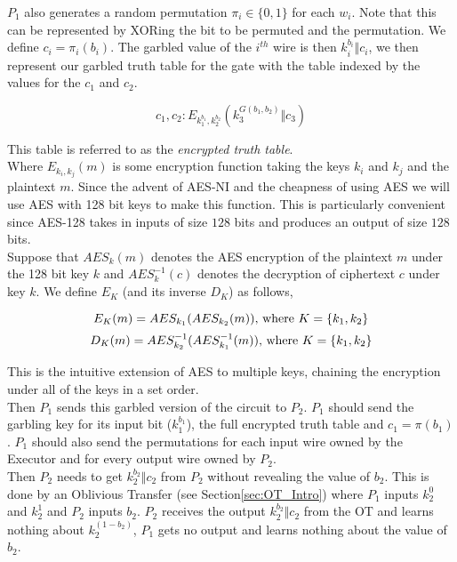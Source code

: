 \documentclass[ %
                    author={Nicholas Tutte},
                supervisor={Prof. Nigel Smart},
                    degree={MEng},
                     title={Secure Two Party Computation},
                  subtitle={A practical comparison of recent protocols},
                      type={Research - GG1K},
                      year={2015} ]{dissertation}
\begin{document}
			$P_1$ also generates a random permutation $\pi_i \in \{0, 1\}$ for each $w_i$. Note that this can be represented by XORing the bit to be permuted and the permutation. We define $c_i = \pi_i(b_i)$. The garbled value of the $i^{th}$ wire is then $k_i^{b_i} \Vert c_i$, we then represent our garbled truth table for the gate with the table indexed by the values for the $c_1$ and $c_2$.

			$$ c_1, c_2 : E_{k_1^{b_1}, k_2^{b_2}} (k_3^{ G(b_1, b_2) } \Vert c_3) $$

			This table is referred to as the \emph{encrypted truth table}.\\

			Where $E_{k_i, k_j}(m)$ is some encryption function taking the keys $k_i$ and $k_j$ and the plaintext $m$. Since the advent of AES-NI and the cheapness of using AES we will use AES with 128 bit keys to make this function. This is particularly convenient since AES-128 takes in inputs of size $128$ bits and produces an output of size $128$ bits.\\

			Suppose that $AES_k(m)$ denotes the AES encryption of the plaintext $m$ under the 128 bit key $k$ and $AES^{-1}_k(c)$ denotes the decryption of ciphertext $c$ under key $k$. We define $E_K$ (and its inverse $D_K$) as follows,

			$$ E_K(m) = AES_{k_1}( AES_{k_2}(m)) \textnormal{, where } K = \{k_1, k_2\}$$ 
			$$ D_K(m) = AES^{-1}_{k_2}( AES^{-1}_{k_{1}}(m)) \textnormal{, where } K = \{k_1, k_2\}$$ 

			This is the intuitive extension of AES to multiple keys, chaining the encryption under all of the keys in a set order.\\

			Then $P_1$ sends this garbled version of the circuit to $P_2$. $P_1$ should send the garbling key for its input bit ($k_1^{b_1}$), the full encrypted truth table and $c_1 = \pi(b_1)$. $P_1$ should also send the permutations for each input wire owned by the Executor and for every output wire owned by $P_2$.\\

			Then $P_2$ needs to get $k_2^{b_2} \Vert c_2$ from $P_2$ without revealing the value of $b_2$. This is done by an Oblivious Transfer (see Section\ref{sec:OT_Intro}) where $P_1$ inputs $k_2^0$ and $k_2^1$ and $P_2$ inputs $b_2$. $P_2$ receives the output $k_2^{b_2} \Vert c_2$ from the OT and learns nothing about $k_2^{(1 - b_2)} $, $P_1$ gets no output and learns nothing about the value of $b_2$.\\
\end{document}

